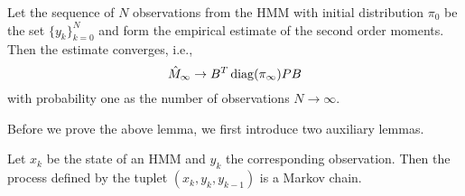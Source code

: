 \documentclass[journal]{IEEEtran}
\begin{document}
\begin{lemma}
    Let the sequence of $N$ observations from the HMM with initial
    distribution $\pi_0$ be the set $\{y_k\}_{k=0}^N$ and form the empirical
    estimate  of the second order moments.  Then the
    estimate converges, i.e.,
    \begin{equation}
        \hat M_\infty \rightarrow B^T \operatorname{diag}(\pi_\infty) P B
    \end{equation}
    with probability one as the number of observations $N \rightarrow \infty$.
    \label{lemma:convergence_M}
\end{lemma}
Before we prove the above lemma, we first introduce two auxiliary lemmas.
\begin{lemma}
    Let $x_k$ be the state of an HMM and $y_k$ the corresponding observation.
    Then the process defined by the tuplet $(x_k, y_k, y_{k-1})$ is a Markov
    chain. 
    \label{lemma:hmm_as_mc}
\end{lemma}
\end{document}
